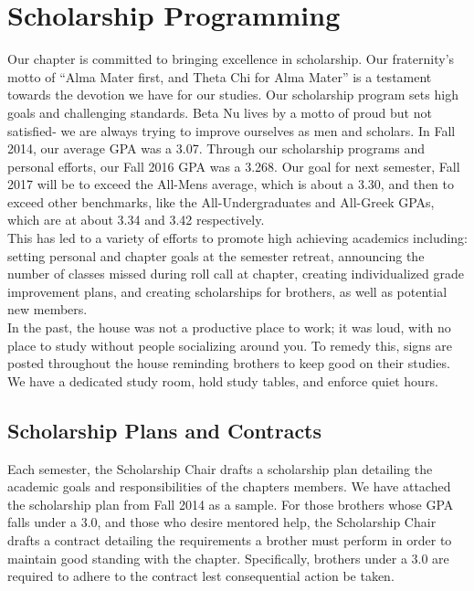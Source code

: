 \chapter{Scholarship Programming}

	Our chapter is committed to bringing excellence in scholarship. Our fraternity’s motto of ``Alma Mater first, and Theta Chi for Alma Mater'' is a testament towards the devotion we have for our studies. Our scholarship program sets high goals and challenging standards. Beta Nu lives by a motto of proud but not satisfied- we are always trying to improve ourselves as men and scholars. In Fall 2014, our average GPA was a 3.07. Through our scholarship programs and personal efforts, our Fall 2016 GPA was a 3.268. Our goal for next semester, Fall 2017 will be to exceed the All-Mens average, which is about a 3.30, and then to exceed other benchmarks, like the All-Undergraduates and All-Greek GPAs, which are at about 3.34 and 3.42 respectively.\\

This has led to a variety of efforts to promote high achieving academics including: setting personal and chapter goals at the semester retreat, announcing the number of classes missed during roll call at chapter, creating individualized grade improvement plans, and creating scholarships for brothers, as well as potential new members.\\

In the past, the house was not a productive place to work; it was loud, with no place to study without people socializing around you. To remedy this, signs are posted throughout the house reminding brothers to keep good on their studies. We have a dedicated study room, hold study tables, and enforce quiet hours. \\
  
  \section*{Scholarship Plans and Contracts}
    Each semester, the Scholarship Chair drafts a scholarship plan detailing the academic goals and responsibilities of the chapters members. We have attached the scholarship plan from Fall 2014 as a sample. For those brothers whose GPA falls under a 3.0, and those who desire mentored help, the Scholarship Chair drafts a contract detailing the requirements a brother must perform in order to maintain good standing with the chapter. Specifically, brothers under a 3.0 are required to adhere to the contract lest consequential action be taken.\\

